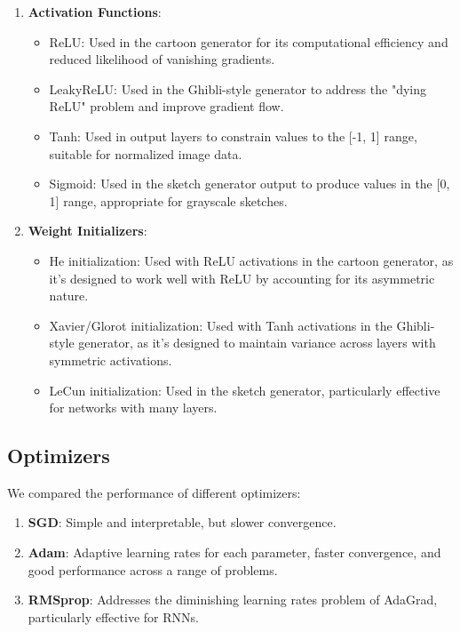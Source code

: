 \documentclass[conference]{IEEEtran}
\begin{document}
\begin{enumerate}
    \item \textbf{Activation Functions}:
    \begin{itemize}
        \item ReLU: Used in the cartoon generator for its computational efficiency and reduced likelihood of vanishing gradients.
        \item LeakyReLU: Used in the Ghibli-style generator to address the "dying ReLU" problem and improve gradient flow.
        \item Tanh: Used in output layers to constrain values to the [-1, 1] range, suitable for normalized image data.
        \item Sigmoid: Used in the sketch generator output to produce values in the [0, 1] range, appropriate for grayscale sketches.
    \end{itemize}
    
    \item \textbf{Weight Initializers}:
    \begin{itemize}
        \item He initialization: Used with ReLU activations in the cartoon generator, as it's designed to work well with ReLU by accounting for its asymmetric nature.
        \item Xavier/Glorot initialization: Used with Tanh activations in the Ghibli-style generator, as it's designed to maintain variance across layers with symmetric activations.
        \item LeCun initialization: Used in the sketch generator, particularly effective for networks with many layers.
    \end{itemize}
\end{enumerate}

\subsection{Optimizers}
We compared the performance of different optimizers:

\begin{enumerate}
    \item \textbf{SGD}: Simple and interpretable, but slower convergence.
    \item \textbf{Adam}: Adaptive learning rates for each parameter, faster convergence, and good performance across a range of problems.
    \item \textbf{RMSprop}: Addresses the diminishing learning rates problem of AdaGrad, particularly effective for RNNs.
\end{enumerate}
\end{document}
